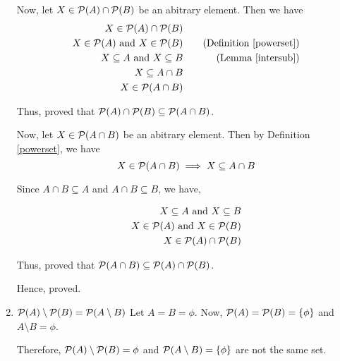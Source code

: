 \begin{enumerate}
				Now, let $X \in \mathcal{P}(A) \cap \mathcal{P}(B)$ be an abitrary element. Then we have 
				\begin{align}
					X \in \mathcal{P}(A) \cap \mathcal{P}(B) \\
					X \in \mathcal{P}(A) \text{ and } X \in \mathcal{P}(B) && \quad \text{(Definition \ref{powerset})}\\
					X \subseteq A \text{ and } X \subseteq B && \quad \text{(Lemma \ref{intersub})} \\
					X \subseteq A \cap B \\
					X \in \mathcal{P}(A \cap B)
				\end{align}

				Thus, proved that $\mathcal{P}(A) \cap \mathcal{P}(B) \subseteq \mathcal{P}(A \cap B)$.

				Now, let $X \in \mathcal{P}(A \cap B)$ be an abitrary element. Then by Definition \ref{powerset}, we have
				$$X \in \mathcal{P}(A \cap B) \implies X \subseteq A \cap B$$

				Since $A \cap B \subseteq A$ and $A \cap B \subseteq B$, we have,

				\begin{align}
					X \subseteq A \text{ and } X \subseteq B \\
					X \in \mathcal{P}(A) \text{ and } X \in \mathcal{P}(B) \\
					X \in \mathcal{P}(A) \cap \mathcal{P}(B)
				\end{align}

				Thus, proved that $\mathcal{P}(A \cap B) \subseteq \mathcal{P}(A) \cap \mathcal{P}(B)$.

				Hence, proved.
			\es

		\item $\mathcal{P}(A) \setminus \mathcal{P}(B) = \mathcal{P}(A \setminus B)$
			\bs
				Let $A = B = \phi$. Now, $\mathcal{P}(A) = \mathcal{P}(B) = \{\phi\}$ and $A \setminus B = \phi$.

				Therefore, $\mathcal{P}(A) \setminus \mathcal{P}(B) = \phi$ and $\mathcal{P}(A \setminus B) = \{\phi\}$ are not the same set.
			\es

	\end{enumerate}
\ep 

